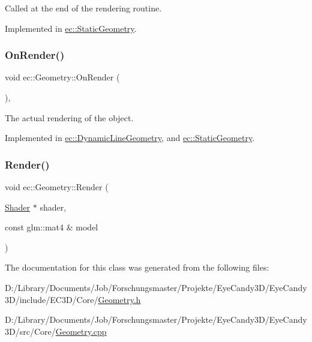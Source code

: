 Called at the end of the rendering routine. 

Implemented in \mbox{\hyperlink{classec_1_1_static_geometry_a2a66505344ad1a9eac31da2cf8171ea9}{ec\+::\+Static\+Geometry}}.

\mbox{\label{classec_1_1_geometry_ae49d24667dca154cba707b0c219a8eb2}} 
\subsubsection{\texorpdfstring{On\+Render()}{OnRender()}}
{\footnotesize\ttfamily void ec\+::\+Geometry\+::\+On\+Render (\begin{DoxyParamCaption}{ }\end{DoxyParamCaption})\hspace{0.3cm}{\ttfamily [protected]}, {}}

The actual rendering of the object. 

Implemented in \mbox{\hyperlink{classec_1_1_dynamic_line_geometry_aea2c2ade5a97294e579a559b20771275}{ec\+::\+Dynamic\+Line\+Geometry}}, and \mbox{\hyperlink{classec_1_1_static_geometry_aa10330a07bc5ccd18d0d61c4c965bccd}{ec\+::\+Static\+Geometry}}.

\mbox{\label{classec_1_1_geometry_a8de70c6fd7391ec0555b2df57912b177}} 
\subsubsection{\texorpdfstring{Render()}{Render()}}
{\footnotesize\ttfamily void ec\+::\+Geometry\+::\+Render (\begin{DoxyParamCaption}\item[{\mbox{\hyperlink{classec_1_1_shader}{Shader}} $\ast$}]{shader,  }\item[{const glm\+::mat4 \&}]{model }\end{DoxyParamCaption})\hspace{0.3cm}{\ttfamily [virtual]}}



The documentation for this class was generated from the following files\+:\begin{DoxyCompactItemize}
\item 
D\+:/\+Library/\+Documents/\+Job/\+Forschungsmaster/\+Projekte/\+Eye\+Candy3\+D/\+Eye\+Candy3\+D/include/\+E\+C3\+D/\+Core/\mbox{\hyperlink{_geometry_8h}{Geometry.\+h}}\item 
D\+:/\+Library/\+Documents/\+Job/\+Forschungsmaster/\+Projekte/\+Eye\+Candy3\+D/\+Eye\+Candy3\+D/src/\+Core/\mbox{\hyperlink{_geometry_8cpp}{Geometry.\+cpp}}\end{DoxyCompactItemize}
